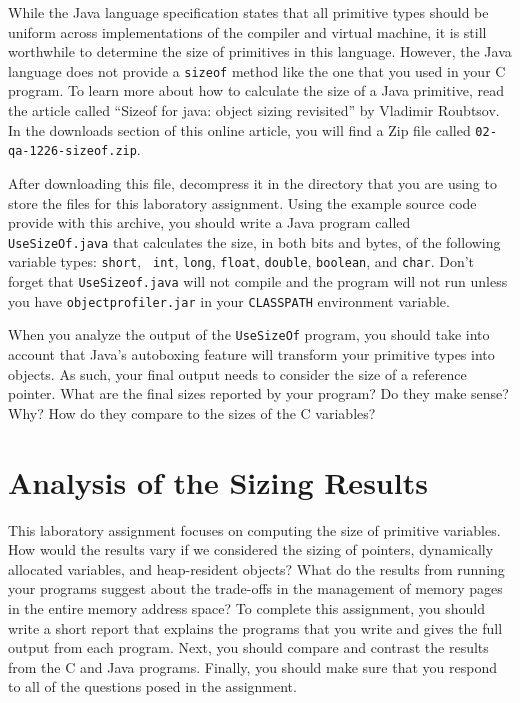   While the Java language specification states that all primitive types should be uniform across implementations of the
  compiler and virtual machine, it is still worthwhile to determine the size of primitives in this language. However,
  the Java language does not provide a {\tt sizeof} method like the one that you used in your C program. To learn more
  about how to calculate the size of a Java primitive, read the article called ``Sizeof for java: object sizing
  revisited'' by Vladimir Roubtsov. In the downloads section of this online article, you will find a Zip file called
  {\tt 02-qa-1226-sizeof.zip}. 

  After downloading this file, decompress it in the directory that you are using to store the files for this laboratory
  assignment. Using the example source code provide with this archive, you should write a Java program called {\tt
  UseSizeOf.java} that calculates the size, in both bits and bytes, of the following variable types:  {\tt short}, {\tt
  int}, {\tt long}, {\tt float}, {\tt double}, {\tt boolean}, and {\tt char}. Don't forget that {\tt UseSizeof.java}
  will not compile and the program will not run unless you have {\tt objectprofiler.jar} in your {\tt CLASSPATH}
  environment variable. 
  
  When you analyze the output of the {\tt UseSizeOf} program, you should take into account that Java's autoboxing
  feature will transform your primitive types into objects.  As such, your final output needs to consider the size of a
  reference pointer. What are the final sizes reported by your program? Do they make sense? Why? How do they compare to
  the sizes of the C variables?

\section*{Analysis of the Sizing Results}

  This laboratory assignment focuses on computing the size of primitive variables. How would the results vary if we
  considered the sizing of pointers, dynamically allocated variables, and heap-resident objects? What do the results
  from running your programs suggest about the trade-offs in the management of memory pages in the entire memory address
  space? To complete this assignment, you should write a short report that explains the programs that you write and
  gives the full output from each program.  Next, you should compare and contrast the results from the C and Java
  programs. Finally, you should make sure that you respond to all of the questions posed in the assignment.

